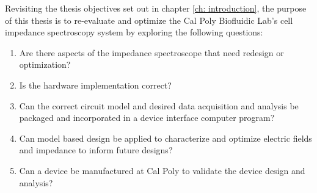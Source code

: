 \label{ch: discussion}



Revisiting the thesis objectives set out in chapter \ref{ch: introduction}, the purpose of this thesis is to re-evaluate and optimize the Cal Poly Biofluidic Lab's cell impedance spectroscopy system by exploring the following questions:

\begin{enumerate}
    \item Are there aspects of the impedance spectroscope that need redesign or optimization?
    \item Is the hardware implementation correct?
    \item Can the correct circuit model and desired data acquisition and analysis be packaged and incorporated in a device interface computer program?
    \item Can model based design be applied to characterize and optimize electric fields and impedance to inform future designs?
    \item Can a device be manufactured at Cal Poly to validate the device design and analysis?
\end{enumerate}

